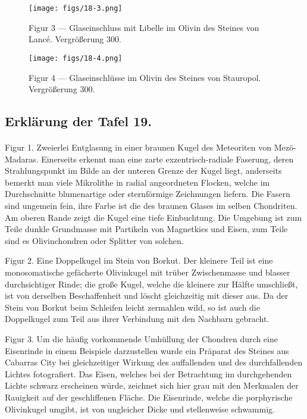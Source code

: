 \documentclass[a4paper, 11pt, oneside, polutonikogreek, german]{article}
\begin{document}
\vspace*{\fill}
\begin{figure}[H]
\centering
\texttt{[image: figs/18-3.png]}
\caption{\small Figur 3 --- Glaseinschluss mit Libelle im Olivin des Steines von Lancé. Vergrößerung 300.}
\end{figure}
\vspace*{\fill}
\clearpage

\vspace*{\fill}
\begin{figure}[H]
\centering
\texttt{[image: figs/18-4.png]}
\caption{\small Figur 4 --- Glaseinschlüsse im Olivin des Steines von Stauropol. Vergrößerung 300.}
\end{figure}
\vspace*{\fill}
\clearpage

\subsection{Erklärung der Tafel 19.}
\paragraph{}
Figur 1. Zweierlei Entglasung in einer braunen Kugel des Meteoriten von Mezö-Madaras. Einerseits erkennt man eine zarte exzentrisch-radiale Faserung, deren Strahlungspunkt im Bilde an der unteren Grenze der Kugel liegt, anderseits bemerkt man viele Mikrolithe in radial angeordneten Flocken, welche im Durchschnitte blumenartige oder sternförmige Zeichnungen liefern. Die Fasern sind ungemein fein, ihre Farbe ist die des braunen Glases im selben Chondriten. Am oberen Rande zeigt die Kugel eine tiefe Einbuchtung. Die Umgebung ist zum Teile dunkle Grundmasse mit Partikeln von Magnetkies und Eisen, zum Teile sind es Olivinchondren oder Splitter von solchen.

Figur 2. Eine Doppelkugel im Stein von Borkut. Der kleinere Teil ist eine monosomatische gefächerte Olivinkugel mit trüber Zwischenmasse und blasser durchsichtiger Rinde; die große Kugel, welche die kleinere zur Hälfte umschließt, ist von derselben Beschaffenheit und löscht gleichzeitig mit dieser aus. Da der Stein von Borkut beim Schleifen leicht zermahlen wild, so ist auch die Doppelkugel zum Teil aus ihrer Verbindung mit den Nachbarn gebracht.

Figur 3. Um die häufig vorkommende Umhüllung der Chondren durch eine Eisenrinde in einem Beispiele darzustellen wurde ein Präparat des Steines aus Cabarras City bei gleichzeitiger Wirkung des auffallenden und des durchfallenden Lichtes fotografiert. Das Eisen, welches bei der Betrachtung im durchgehenden Lichte schwarz erscheinen würde, zeichnet sich hier grau mit den Merkmalen der Rauigkeit auf der geschliffenen Fläche. Die Eisenrinde, welche die porphyrische Olivinkugel umgibt, ist von ungleicher Dicke und stellenweise schwammig.
\end{document}
